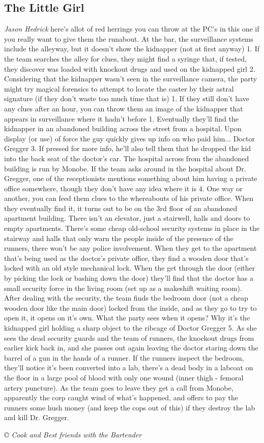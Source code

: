 \documentclass[letterpaper,onecolumn,10pt]{article}
\renewcommand{\textsc}[1]{{\fontspec{Friz Quadrata SC TT}\selectfont #1}}
\newcommand{\getyear}[1]{\StrLeft{#1}{4}}
\newenvironment{scenario}[6]
	{
		\section[#1 {\small\textsc{[#2]}}]{#1} \nopagebreak

		\noindent{\textsc{#2}}\nopagebreak

		\noindent\textit{#3}\nopagebreak
		\def\TMPSCENARIO{{\small\textit{©\getyear{#5}{} #4}}}
	}
	{\TMPSCENARIO}
\newcommand{\johnson}[2]{\textbf{Johnson: #1 (#2):}}
\newcommand{\synopsis}{\textbf{Synopsis: }}
\begin{document}
\begin{multicols}{2}
\begin{scenario}{The Little Girl}
\johnson{Jason Hedrick}{Cook and Best friends with the Bartender} 

\synopsis  There's allot of red herrings you can throw at the PC's in this one if you really want to give them the runabout. At the bar, the surveillance systems include the alleyway, but it doesn't show the kidnapper (not at first anyway) 1. If the team searches the alley for clues, they might find a syringe that, if tested, they discover was loaded with knockout drugs and used on the kidnapped girl 2. Considering that the kidnapper wasn't seen in the surveillance camera, the party might try magical forensics to attempt to locate the caster by their astral signature (if they don't waste too much time that is) 1. If they still don't have any clues after an hour, you can throw them an image of the kidnapper that appears in surveillance where it hadn't before 1. Eventually they'll find the kidnapper in an abandoned building across the street from a hospital. Upon display (or use) of force the guy quickly gives up info on who paid him... Doctor Gregger 3. If pressed for more info, he'll also tell them that he dropped the kid into the back seat of the doctor's car. The hospital across from the abandoned building is run by Monobe. If the team asks around in the hospital about Dr. Gregger, one of the receptionists mentions something about him having a private office somewhere, though they don't have any idea where it is 4. One way or another, you can feed them clues to the whereabouts of his private office. When they eventually find it, it turns out to be on the 3rd floor of an abandoned apartment building. There isn't an elevator, just a stairwell, halls and doors to empty apartments. There's some cheap old-school security systems in place in the stairway and halls that only warn the people inside of the presence of the runners, there won't be any police involvement. When they get to the apartment that's being used as the doctor's private office, they find a wooden door that's locked with an old style mechanical lock. When the get through the door (either by picking the lock or bashing down the door) they'll find that the doctor has a small security force in the living room (set up as a makeshift waiting room). After dealing with the security, the team finds the bedroom door (not a cheap wooden door like the main door) locked from the inside, and as they go to try to open it, it opens on it's own. What the party sees when it opens? Why it's the kidnapped girl holding a sharp object to the ribcage of Doctor Gregger 5. As she sees the dead security guards and the team of runners, the knockout drugs from earlier kick back in, and she passes out again leaving the doctor staring down the barrel of a gun in the hands of a runner. If the runners inspect the bedroom, they'll notice it's been converted into a lab, there's a dead body in a labcoat on the floor in a large pool of blood with only one wound (inner thigh - femoral artery puncture). As the team goes to leave they get a call from Monobe, apparently the corp caught wind of what's happened, and offers to pay the runners some hush money (and keep the cops out of this) if they destroy the lab and kill Dr. Gregger.


\end{scenario}
\end{multicols}
\end{document}
